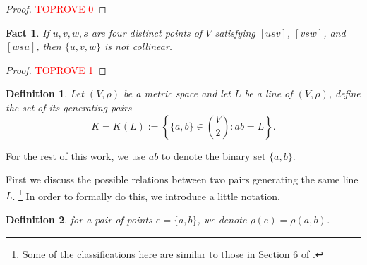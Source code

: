 \documentclass[12pt]{article}
\newcommand{\ov}{\overline}
\newtheorem{fact}{Fact}
\newtheorem{defi}{Definition}
\begin{document}
\begin{proof}\textcolor{red}{TOPROVE 0}\end{proof}

\begin{fact}\label{fact.star}
If $u, v, w, s$ are four distinct points of $V$ satisfying
$[usv]$, $[vsw]$, and $[wsu]$, then $\{u, v, w\}$ is not collinear.
\end{fact}

\begin{proof}\textcolor{red}{TOPROVE 1}\end{proof}

\begin{defi}
Let $(V, \rho)$ be a metric space and let $L$ be a line of $(V, \rho)$,
define the set of its {\em generating pairs}
\begin{equation}\label{eq.def_generator_pairs}
K = K(L) := \left\{ \{a, b\} \in \binom{V}{2} : \ov{ab} = L \right\}.
\end{equation}
\end{defi}

For the rest of this work, we use $ab$ to denote the binary set $\{a, b\}$.

First we discuss the possible relations between two pairs generating the same line $L$.
\footnote{Some of the classifications here are similar to those in Section 6 of \cite{ACHKS}.}
In order to formally do this, we introduce a little notation.

\begin{defi}
for a pair of points $e = \{a, b\}$, we denote $\rho(e) = \rho(a, b)$.
\end{defi}
\end{document}
